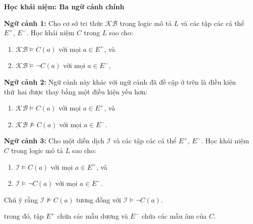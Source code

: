 \documentclass[notheorems,xcolor=dvipsnames]{beamer}
\newcommand{\mI}		{\mathcal{I}}
\newcommand{\KB}		{\mathcal{KB}}
\begin{document}
\begin{frame}{\bf Học khái niệm: Ba ngữ cảnh chính}
	\vspace{-1.0ex}
	\begin{block}{}
	{\small 
		\vspace{-1.0ex}
		{\bf Ngữ cảnh 1:} Cho cơ sở tri thức $\KB$ trong logic mô tả $L$ và các tập các cá thể $E^+$, $E^-$. Học khái niệm $C$ trong $L$ sao cho:
		\vspace{-1.0ex}
		\begin{enumerate}
			\setlength{\itemsep}{-0.1ex}
			\item $\KB \models C(a)$ với mọi $a \in E^+$, và
			\item $\KB \models \lnot C(a)$ với mọi $a \in E^-$,
		\end{enumerate}
	}
	\end{block}
	\vspace{-0.7ex}

	\begin{block}{}
	{\small 
		\vspace{-1.0ex}
		{\bf Ngữ cảnh 2:} Ngữ cảnh này khác với ngữ cảnh đã đề cập ở trên là điều kiện thứ~hai được thay bằng một điều kiện yếu hơn:
		\vspace{-1.0ex}
		\begin{enumerate}
			\setlength{\itemsep}{-0.1ex}
			\item $\KB \models C(a)$ với mọi $a \in E^+$, và
			\item $\KB \not\models C(a)$ với mọi $a \in E^-$.
		\end{enumerate}
	}
	\end{block}
	\vspace{-0.7ex}
	
	\begin{block}{}
	{\small 
		\vspace{-1.0ex}
		{\bf Ngữ cảnh 3:} Cho một diễn dịch $\mI$ và các tập các cá thể $E^+$, $E^-$. Học khái niệm $C$ trong logic mô tả $L$ sao cho:
		\vspace{-1.0ex}
		\begin{enumerate}
			\setlength{\itemsep}{-0.1ex}
			\item $\mI \models C(a)$ với mọi $a \in E^+$, và
			\item $\mI \models \lnot C(a)$ với mọi $a \in E^-$.
		\end{enumerate}
		\vspace{-1.0ex}
		Chú ý rằng $\mI \not\models C(a)$ tương đồng với $\mI \models \lnot C(a)$.
	}
	\end{block}
	\vspace{-1.0ex}	
	trong đó, tập $E^+$ chứa các mẫu dương và $E^-$ chứa các mẫu âm của $C$.
\end{frame}
\end{document}
